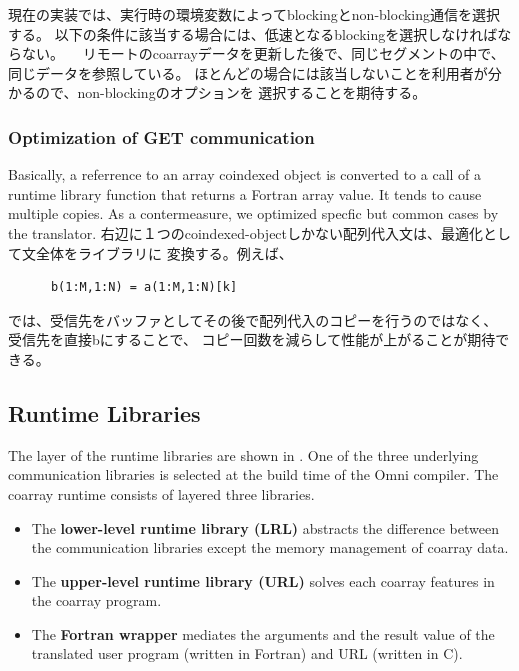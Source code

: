 現在の実装では、実行時の環境変数によってblockingとnon-blocking通信を選択する。
以下の条件に該当する場合には、低速となるblockingを選択しなければならない。
　リモートのcoarrayデータを更新した後で、同じセグメントの中で、同じデータを参照している。
ほとんどの場合には該当しないことを利用者が分かるので、non-blockingのオプションを
選択することを期待する。


\subsubsection{Optimization of GET communication}

Basically, a referrence to an array coindexed object is converted to a 
call of a runtime library function that returns a Fortran array value.
It tends to cause multiple copies.
As a contermeasure, we optimized specfic but common cases by the translator.
右辺に１つのcoindexed-objectしかない配列代入文は、最適化として文全体をライブラリに
変換する。例えば、
\begin{verbatim}
      b(1:M,1:N) = a(1:M,1:N)[k]
\end{verbatim}
では、受信先をバッファとしてその後で配列代入のコピーを行うのではなく、
受信先を直接bにすることで、
コピー回数を減らして性能が上がることが期待できる。


\subsection{Runtime Libraries}\label{sec:runtime}

The layer of the runtime libraries are shown in .
One of the three underlying communication libraries is selected 
at the build time of the Omni compiler.
The coarray runtime consists of layered three libraries.
\begin{itemize}
\item
The {\bf lower-level runtime library (LRL)} abstracts the difference between 
the communication libraries except the memory management of coarray data.
\item
The {\bf upper-level runtime library (URL)} solves each coarray features 
in the coarray program.
\item
The {\bf Fortran wrapper} mediates the arguments and the result value 
of the translated user program (written in Fortran) and URL (written in C).
\end{itemize}


